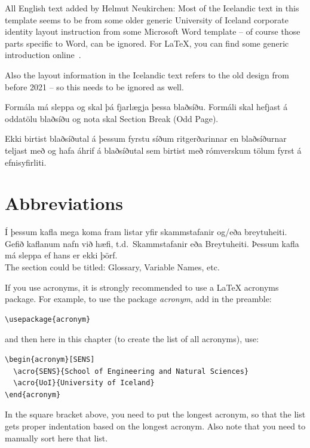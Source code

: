 \documentclass[a4paper,12pt,twoside,BCOR=10mm]{scrbook}
\begin{document}
All English text added by Helmut Neukirchen:
Most of the Icelandic text in this template seems to be from some
older generic University of Iceland corporate identity layout
instruction from some Microsoft Word template -- of course those parts
specific to Word, can be ignored. For \LaTeX, you can find some
generic introduction online~\mbox{\cite{lshort,latex-tutorial}}.%

Also the layout information in the Icelandic text refers to the old
design from before 2021 -- so this needs to be ignored as well.

Formála má sleppa og skal þá fjarlægja þessa blaðsíðu. Formáli skal hefjast á oddatölu blaðsíðu og nota skal Section Break (Odd Page).

Ekki birtist blaðsíðutal á þessum fyrstu síðum ritgerðarinnar en blaðsíðurnar teljast með og hafa áhrif á blaðsíðutal sem birtist með rómverskum tölum fyrst á efnisyfirliti.


\hypersetup{pageanchor=true}
\tableofcontents
\listoffigures
\listoftables

\chapter*{Abbreviations}

Í þessum kafla mega koma fram listar yfir skammstafanir og/eða breytuheiti. Gefið kaflanum nafn við hæfi, t.d.\ Skammstafanir eða Breytuheiti. Þessum kafla má sleppa ef hans er ekki þörf. \\

The section could be titled: Glossary, Variable Names, etc.

If you use acronyms, it is strongly recommended to use a LaTeX
acronyms package. For example, to use the package \emph{acronym}, add
in the preamble:
\begin{verbatim}
\usepackage{acronym}
\end{verbatim}
and then here in this chapter (to create the list of all acronyms), use:
\begin{verbatim}
\begin{acronym}[SENS]
  \acro{SENS}{School of Engineering and Natural Sciences}
  \acro{UoI}{University of Iceland}
\end{acronym}
\end{verbatim}
In the square bracket above, you need to put the longest acronym, so
that the list gets proper indentation based on the longest acronym.
Also note that you need to manually sort here that list.
\end{document}
